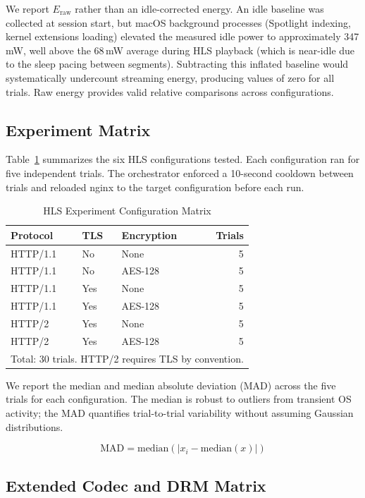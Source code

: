 \documentclass[conference]{IEEEtran}
\begin{document}
We report $E_{\text{raw}}$ rather than an idle-corrected energy. An idle baseline was
collected at session start, but macOS background processes (Spotlight indexing, kernel
extensions loading) elevated the measured idle power to approximately 347\,mW, well
above the 68\,mW average during HLS playback (which is near-idle due to the sleep
pacing between segments). Subtracting this inflated baseline would systematically
undercount streaming energy, producing values of zero for all trials. Raw energy
provides valid relative comparisons across configurations.

\subsection{Experiment Matrix}

Table~\ref{tab:matrix} summarizes the six HLS configurations tested. Each
configuration ran for five independent trials. The orchestrator enforced a 10-second
cooldown between trials and reloaded nginx to the target configuration before each
run.

\begin{table}[t]
\caption{HLS Experiment Configuration Matrix}
\label{tab:matrix}
\centering
\begin{tabular}{lllr}
\hline
Protocol & TLS & Encryption & Trials \\
\hline
HTTP/1.1 & No  & None    & 5 \\
HTTP/1.1 & No  & AES-128 & 5 \\
HTTP/1.1 & Yes & None    & 5 \\
HTTP/1.1 & Yes & AES-128 & 5 \\
HTTP/2   & Yes & None    & 5 \\
HTTP/2   & Yes & AES-128 & 5 \\
\hline
\multicolumn{4}{l}{Total: 30 trials. HTTP/2 requires TLS by convention.}
\end{tabular}
\end{table}

We report the median and median absolute deviation (MAD) across the five trials for
each configuration. The median is robust to outliers from transient OS activity; the
MAD quantifies trial-to-trial variability without assuming Gaussian distributions.

\begin{equation}
\text{MAD} = \text{median}\left( |x_i - \text{median}(x)| \right)
\end{equation}

\subsection{Extended Codec and DRM Matrix}
\end{document}
